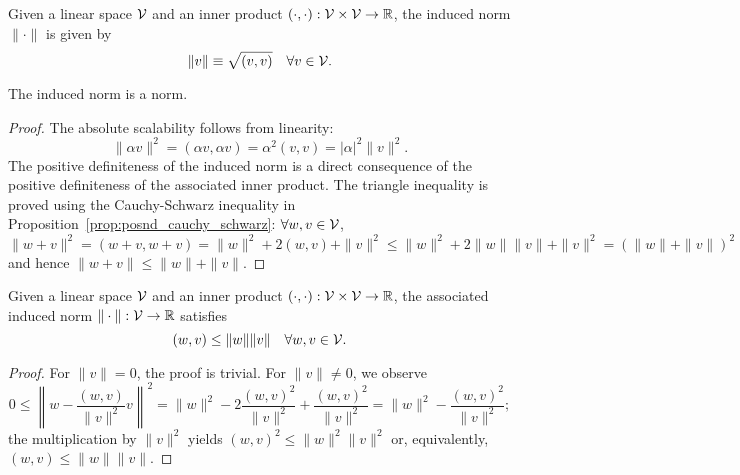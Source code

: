 \begin{definition}
  Given a linear space $\mathcal{V}$ and an inner product $(\cdot,\cdot): \mathcal{V} \times \mathcal{V} \to \mathbb{R}$, the induced norm $\| \cdot \|$ is given by
  \begin{equation*}
    \| v \| \equiv \sqrt{(v,v)} \quad \forall v \in \mathcal{V}.
  \end{equation*}
\end{definition}
\begin{remark}
  The induced norm is a norm.
  \begin{proof}
     The absolute scalability follows from linearity:
     \begin{equation*}
       \| \alpha v \|^2 = (\alpha v, \alpha v) = \alpha^2 (v,v) = |\alpha|^2 \| v \|^2.
     \end{equation*}
     The positive definiteness of the induced norm is a direct consequence of the positive definiteness of the associated inner product.  The triangle inequality is proved using the Cauchy-Schwarz inequality in Proposition~\ref{prop:posnd_cauchy_schwarz}: $\forall w,v \in \mathcal{V}$, 
     \begin{equation*}
       \| w + v \|^2
       = (w + v, w+ v)
       = \| w \|^2 + 2(w,v) + \| v \|^2
       \leq \| w \|^2 + 2 \| w \| \| v \| + \| v \|^2
       =  (\| w \| + \| v \|)^2
     \end{equation*}
     and hence $\| w + v \| \leq \| w \| + \| v \|$.
  \end{proof}
\end{remark}
\begin{proposition}
  \label{prop:posnd_cauchy_schwarz}
  Given a linear space $\mathcal{V}$ and an inner product $(\cdot, \cdot): \mathcal{V} \times \mathcal{V} \to \mathbb{R}$, the associated induced norm $\| \cdot \|: \mathcal{V} \to \mathbb{R}$ satisfies
  \begin{equation*}
    (w,v) \leq \| w \| \| v \| \quad \forall w ,v \in \mathcal{V}.
  \end{equation*}
  \begin{proof}
    For $\|v\|=0$, the proof is trivial.  For $\| v \| \neq 0$, we observe
    \begin{equation*}
      0 \leq \left\| w - \frac{(w,v)}{\| v \|^2} v \right\|^2
      = \| w \|^2 - 2 \frac{(w,v)^2}{\| v \|^2} + \frac{(w,v)^2}{\| v \|^2}
      = \| w \|^2 - \frac{(w,v)^2}{\| v \|^2};
    \end{equation*}
    the multiplication by $\| v \|^2$ yields $(w,v)^2 \leq \| w \|^2 \| v \|^2$ or, equivalently, $(w,v) \leq \| w \| \| v \|$.
  \end{proof}
\end{proposition}

